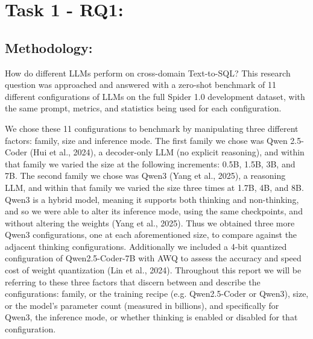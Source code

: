 \section*{Task 1 - RQ1:}

\FloatBarrier
\subsection*{Methodology:}

How do different LLMs perform on cross-domain Text-to-SQL? This research question was approached and answered with a zero-shot benchmark of 11 different configurations of LLMs on the full Spider 1.0 development dataset, with the same prompt, metrics, and statistics being used for each configuration.

We chose these 11 configurations to benchmark by manipulating three different factors: family, size and inference mode. The first family we chose was Qwen 2.5-Coder (Hui et al., 2024), a decoder-only LLM (no explicit reasoning), and within that family we varied the size at the following increments: 0.5B, 1.5B, 3B, and 7B. The second family we chose was Qwen3 (Yang et al., 2025), a reasoning LLM, and within that family we varied the size three times at 1.7B, 4B, and 8B. Qwen3 is a hybrid model, meaning it supports both thinking and non-thinking, and so we were able to alter its inference mode, using the same checkpoints, and without altering the weights (Yang et al., 2025). Thus we obtained three more Qwen3 configurations, one at each aforementioned size, to compare against the adjacent thinking configurations. Additionally we included a 4-bit quantized configuration of Qwen2.5-Coder-7B with AWQ to assess the accuracy and speed cost of weight quantization (Lin et al., 2024). Throughout this report we will be referring to these three factors that discern between and describe the configurations: family, or the training recipe (e.g. Qwen2.5-Coder or Qwen3), size, or the model's parameter count (measured in billions), and specifically for Qwen3, the inference mode, or whether thinking is enabled or disabled for that configuration.

